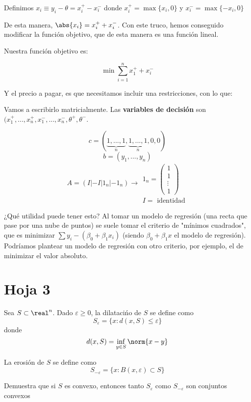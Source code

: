\begin{problem}[9]
Definimos $x_i \equiv y_i - \theta = x_i^+ - x_i^-$ donde $x_i^+ = \max\{x_i,0\}$ y $x_i^- = \max\{-x_i,0\}$

De esta manera, $\abs{x_i} = x_i^+ + x_i^-$. Con este truco, hemos conseguido modificar la función objetivo, que de esta manera es una función lineal.

Nuestra función objetivo es:

\[\min \sum_{i=1}^n x_1^+ + x_i^-\]

Y el precio a pagar, es que necesitamos incluir una restricciones, con lo que:


\begin{ioprob}
\goal{\[\min \sum_{i=1}^n x_1^+ + x_i^-\]}
\end{ioprob}


Vamos a escribirlo matricialmente.
Las \textbf{variables de decisión} son $(x_1^+,...,x_n^+,x_1^-,...,x_n^-,\theta^+,\theta^-$. 

\[c = (\underbrace{1,...,1}_{n},\underbrace{1,...,1}_{n},0,0)\]
\[b = (y_1,...,y_n) \]
\[A = \left( I | -I | 1_n | -1_n\right)\to \begin{array}{c}1_n = \begin{pmatrix}1\\1\\\vdots\\1\end{pmatrix}\\ I = \text{ identidad} \end{array}\]




\obs{}
¿Qué utilidad puede tener esto?
Al tomar un modelo de regresión (una recta que pase por una nube de puntos) se suele tomar el criterio de "mínimos cuadrados", que es minimizar $\sum y_i-(β_0+β_1x_i)$ (siendo $β_0+β_1x$ el modelo de regresión). 
Podríamos plantear un modelo de regresión con otro criterio, por ejemplo, el de minimizar el valor absoluto.




\end{problem}



\section{Hoja 3}
\begin{problem}[1]
Sea $S\subset \real^n$. Dado $ε\geq 0$, la dilatacińo de $S$ se define como \[S_ε = \{x:d(x,S)\leq ε\}\] donde \[d(x,S) = \inf_{y\in S}{\norm{x-y}}\]

La erosión de $S$ se define como 
\[S_{-ε} = \{x:B(x,ε) \subset S \} \]

Demuestra que si $S$ es convexo, entonces tanto $S_{ε}$ como $S_{-ε}$ son conjuntos convexos

\solution
{}

\end{problem}


